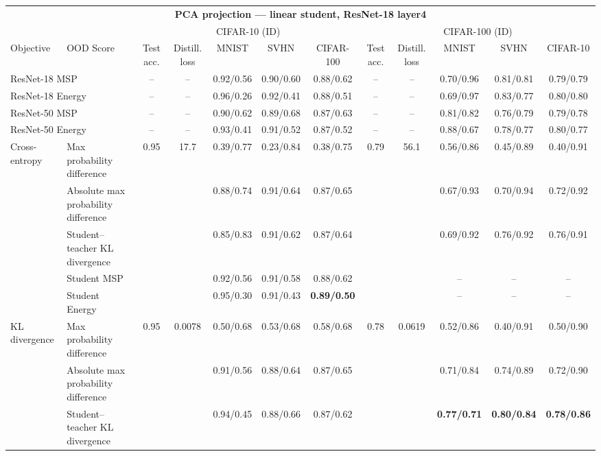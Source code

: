\documentclass[border=2pt]{standalone}
\begin{document}
\scriptsize
\setlength{\tabcolsep}{4pt}
\begin{tabular}{llcccccccccc}
\multicolumn{12}{c}{\textbf{PCA projection --- linear student, ResNet-18 layer4}}\\[4pt]
\multicolumn{2}{c}{} & \multicolumn{5}{c}{CIFAR-10 (ID)} & \multicolumn{5}{c}{CIFAR-100 (ID)} \\
\cmidrule(lr){3-7} \cmidrule(lr){8-12}
\toprule
Objective & OOD Score & Test acc. & Distill. loss & MNIST & SVHN & CIFAR-100 & Test acc. & Distill. loss & MNIST & SVHN & CIFAR-10 \\
\midrule
\multicolumn{2}{l}{ResNet-18 MSP} & -- & -- & 0.92/0.56 & 0.90/0.60 & 0.88/0.62 & -- & -- & 0.70/0.96 & 0.81/0.81 & 0.79/0.79 \\
\multicolumn{2}{l}{ResNet-18 Energy} & -- & -- & 0.96/0.26 & 0.92/0.41 & 0.88/0.51 & -- & -- & 0.69/0.97 & 0.83/0.77 & 0.80/0.80 \\
\multicolumn{2}{l}{ResNet-50 MSP} & -- & -- & 0.90/0.62 & 0.89/0.68 & 0.87/0.63 & -- & -- & 0.81/0.82 & 0.76/0.79 & 0.79/0.78 \\
\multicolumn{2}{l}{ResNet-50 Energy} & -- & -- & 0.93/0.41 & 0.91/0.52 & 0.87/0.52 & -- & -- & 0.88/0.67 & 0.78/0.77 & 0.80/0.77 \\
\midrule
Cross-entropy & Max probability difference & 0.95 & 17.7 & 0.39/0.77 & 0.23/0.84 & 0.38/0.75 & 0.79 & 56.1 & 0.56/0.86 & 0.45/0.89 & 0.40/0.91 \\
 & Absolute max probability difference &  &  & 0.88/0.74 & 0.91/0.64 & 0.87/0.65 &  &  & 0.67/0.93 & 0.70/0.94 & 0.72/0.92 \\
 & Student--teacher KL divergence &  &  & 0.85/0.83 & 0.91/0.62 & 0.87/0.64 &  &  & 0.69/0.92 & 0.76/0.92 & 0.76/0.91 \\
 & Student MSP &  &  & 0.92/0.56 & 0.91/0.58 & 0.88/0.62 &  &  & -- & -- & -- \\
 & Student Energy &  &  & 0.95/0.30 & 0.91/0.43 & \textbf{0.89/0.50} &  &  & -- & -- & -- \\
\addlinespace
KL divergence & Max probability difference & 0.95 & 0.0078 & 0.50/0.68 & 0.53/0.68 & 0.58/0.68 & 0.78 & 0.0619 & 0.52/0.86 & 0.40/0.91 & 0.50/0.90 \\
 & Absolute max probability difference &  &  & 0.91/0.56 & 0.88/0.64 & 0.87/0.65 &  &  & 0.71/0.84 & 0.74/0.89 & 0.72/0.90 \\
 & Student--teacher KL divergence &  &  & 0.94/0.45 & 0.88/0.66 & 0.87/0.62 &  &  & \textbf{0.77/0.71} & \textbf{0.80/0.84} & \textbf{0.78/0.86} \\

\end{tabular}
\end{document}
